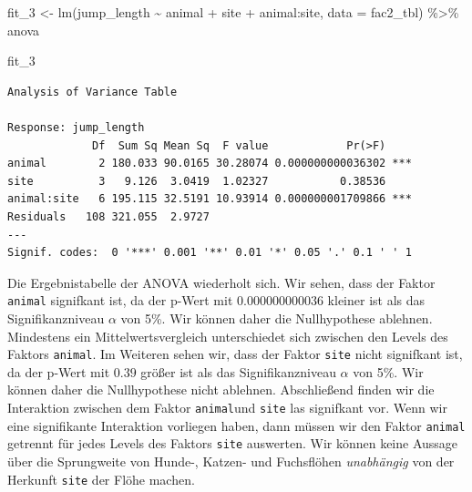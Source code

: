 \documentclass[
  letterpaper,
  DIV=11,
  oneside]{scrreport}
\newenvironment{Shaded}{\begin{snugshade}}{\end{snugshade}}
\newcommand{\AttributeTok}[1]{\textcolor[rgb]{0.40,0.45,0.13}{#1}}
\newcommand{\FunctionTok}[1]{\textcolor[rgb]{0.28,0.35,0.67}{#1}}
\newcommand{\NormalTok}[1]{\textcolor[rgb]{0.00,0.23,0.31}{#1}}
\newcommand{\OtherTok}[1]{\textcolor[rgb]{0.00,0.23,0.31}{#1}}
\newcommand{\SpecialCharTok}[1]{\textcolor[rgb]{0.37,0.37,0.37}{#1}}
\begin{document}
\begin{Shaded}
\begin{Highlighting}[]
\NormalTok{fit\_3 }\OtherTok{\textless{}{-}}  \FunctionTok{lm}\NormalTok{(jump\_length }\SpecialCharTok{\textasciitilde{}}\NormalTok{ animal }\SpecialCharTok{+}\NormalTok{ site }\SpecialCharTok{+}\NormalTok{ animal}\SpecialCharTok{:}\NormalTok{site, }\AttributeTok{data =}\NormalTok{ fac2\_tbl) }\SpecialCharTok{\%\textgreater{}\%} 
\NormalTok{  anova}

\NormalTok{fit\_3}
\end{Highlighting}
\end{Shaded}

\begin{verbatim}
Analysis of Variance Table

Response: jump_length
             Df  Sum Sq Mean Sq  F value            Pr(>F)    
animal        2 180.033 90.0165 30.28074 0.000000000036302 ***
site          3   9.126  3.0419  1.02327           0.38536    
animal:site   6 195.115 32.5191 10.93914 0.000000001709866 ***
Residuals   108 321.055  2.9727                               
---
Signif. codes:  0 '***' 0.001 '**' 0.01 '*' 0.05 '.' 0.1 ' ' 1
\end{verbatim}

{}

Die Ergebnistabelle der ANOVA wiederholt sich. Wir sehen, dass der
Faktor \texttt{animal} signifkant ist, da der p-Wert mit
\(0.000000000036\) kleiner ist als das Signifikanzniveau \(\alpha\) von
5\%. Wir können daher die Nullhypothese ablehnen. Mindestens ein
Mittelwertsvergleich unterschiedet sich zwischen den Levels des Faktors
\texttt{animal}. Im Weiteren sehen wir, dass der Faktor \texttt{site}
nicht signifkant ist, da der p-Wert mit \(0.39\) größer ist als das
Signifikanzniveau \(\alpha\) von 5\%. Wir können daher die Nullhypothese
nicht ablehnen. Abschließend finden wir die Interaktion zwischen dem
Faktor \texttt{animal}und \texttt{site} las signifkant vor. Wenn wir
eine signifikante Interaktion vorliegen haben, dann müssen wir den
Faktor \texttt{animal} getrennt für jedes Levels des Faktors
\texttt{site} auswerten. Wir können keine Aussage über die Sprungweite
von Hunde-, Katzen- und Fuchsflöhen \emph{unabhängig} von der Herkunft
\texttt{site} der Flöhe machen.
\end{document}

